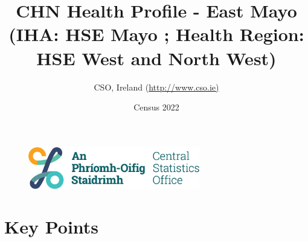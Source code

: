 \documentclass{article}
\title{CHN Health Profile - East Mayo (IHA: HSE Mayo ;  Health Region: HSE West and North West) }
\date{Census 2022}
\author{CSO, Ireland  (\url{http://www.cso.ie)}}
\begin{document}


\begin{figure}
	\centering
\includegraphics[width =75mm]{../figures/CSO_Logo.png}
\end{figure}

				 
		   
						  
														  
																																													
												 
			 
\maketitle
					
													   
				 
						 
																																																																											   
				 
				  
  \pagebreak
    	    \tableofcontents

\pagebreak


\section{Key Points}
\end{document}
